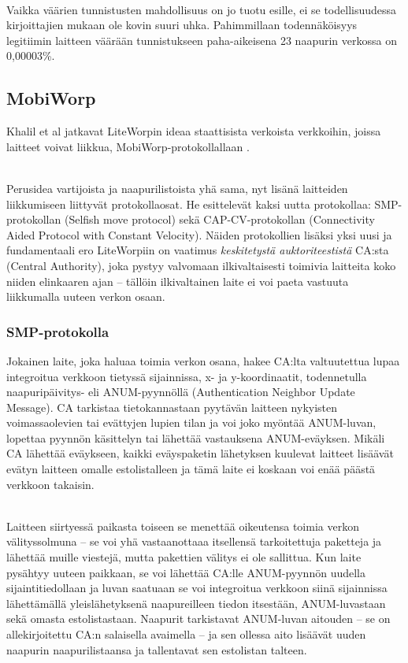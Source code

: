 \documentclass[finnish]{tktltiki2}
\theoremstyle{definition}
\theoremstyle{remark}
\begin{document}
\noindent \\
Vaikka väärien tunnistusten mahdollisuus on jo tuotu esille, ei se todellisuudessa kirjoittajien mukaan ole kovin suuri uhka. Pahimmillaan todennäköisyys legitiimin laitteen väärään tunnistukseen paha-aikeisena 23 naapurin verkossa on 0,00003\%.

% 
% 
% 
% 
% 
% 
% 
% 
% 
% 
% 
% 
\subsection{MobiWorp}
% 
% 
% 
% 
% 
% 
% 
% 
% 
% 
% 
% 

Khalil et al jatkavat LiteWorpin ideaa staattisista verkoista verkkoihin, joissa laitteet voivat liikkua, MobiWorp-protokollallaan \cite{mobiworp}.

\noindent \\
Perusidea vartijoista ja naapurilistoista yhä sama, nyt lisänä laitteiden liikkumiseen liittyvät protokollaosat. He esittelevät kaksi uutta protokollaa: SMP-protokollan (Selfish move protocol) sekä CAP-CV-protokollan (Connectivity Aided Protocol with Constant Velocity). Näiden protokollien lisäksi yksi uusi ja fundamentaali ero LiteWorpiin on vaatimus \emph{keskitetystä auktoriteestistä} CA:sta (Central Authority), joka pystyy valvomaan ilkivaltaisesti toimivia laitteita koko niiden elinkaaren ajan -- tällöin ilkivaltainen laite ei voi paeta vastuuta liikkumalla uuteen verkon osaan.

\subsubsection{SMP-protokolla}

Jokainen laite, joka haluaa toimia verkon osana, hakee CA:lta valtuutettua lupaa integroitua verkkoon tietyssä sijainnissa, x- ja y-koordinaatit, todennetulla naapuripäivitys- eli ANUM-pyynnöllä (Authentication Neighbor Update Message). CA tarkistaa tietokannastaan pyytävän laitteen nykyisten voimassaolevien tai evättyjen lupien tilan ja voi joko myöntää ANUM-luvan, lopettaa pyynnön käsittelyn tai lähettää vastauksena ANUM-eväyksen. Mikäli CA lähettää eväykseen, kaikki eväyspaketin lähetyksen kuulevat laitteet lisäävät evätyn laitteen omalle estolistalleen ja tämä laite ei koskaan voi enää päästä verkkoon takaisin.

\noindent\\
Laitteen siirtyessä paikasta toiseen se menettää oikeutensa toimia verkon välityssolmuna -- se voi yhä vastaanottaaa itsellensä tarkoitettuja paketteja ja lähettää muille viestejä, mutta pakettien välitys ei ole sallittua. Kun laite pysähtyy uuteen paikkaan, se voi lähettää CA:lle ANUM-pyynnön uudella sijaintitiedollaan ja luvan saatuaan se voi integroitua verkkoon siinä sijainnissa lähettämällä yleislähetyksenä naapureilleen tiedon itsestään, ANUM-luvastaan sekä omasta estolistastaan. Naapurit tarkistavat ANUM-luvan aitouden -- se on allekirjoitettu CA:n salaisella avaimella -- ja sen ollessa aito lisäävät uuden naapurin naapurilistaansa ja tallentavat sen estolistan talteen.
\end{document}
